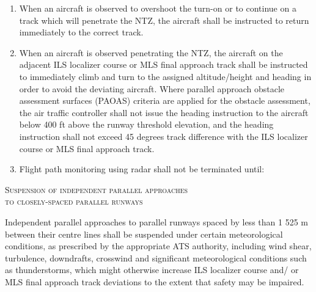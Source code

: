 \documentclass[../main.tex]{subfiles}
\begin{document}
\begin{enumeratesc}
\begin{enumerate}
            \item When an aircraft is observed to overshoot the turn-on or to continue on a track which will penetrate the NTZ, the aircraft shall be instructed to return immediately to the correct track.
            \item When an aircraft is observed penetrating the NTZ, the aircraft on the adjacent ILS localizer course or MLS final approach track shall be instructed to immediately climb and turn to the assigned altitude/height and heading in order to avoid the deviating aircraft. Where parallel approach obstacle assessment surfaces (PAOAS) criteria are applied for the obstacle assessment, the air traffic controller shall not issue the heading instruction to the aircraft below 400 ft above the runway threshold elevation, and the heading instruction shall not exceed 45 degrees track difference with the ILS localizer course or MLS final approach track.
            \item Flight path monitoring using radar shall not be terminated until:


        \end{enumerate}

        \item \textsc{Suspension of independent parallel approaches \\ to closely-spaced parallel runways}
        \begin{enumempty}
            \item Independent parallel approaches to parallel runways spaced by less than 1 525 m between their centre lines shall be suspended under certain meteorological conditions, as prescribed by the appropriate ATS authority, including wind shear, turbulence, downdrafts, crosswind and significant meteorological conditions such as thunderstorms, which might otherwise increase ILS localizer course and/ or MLS final approach track deviations to the extent that safety may be impaired.


\end{enumempty}
\end{enumeratesc}
\end{document}
